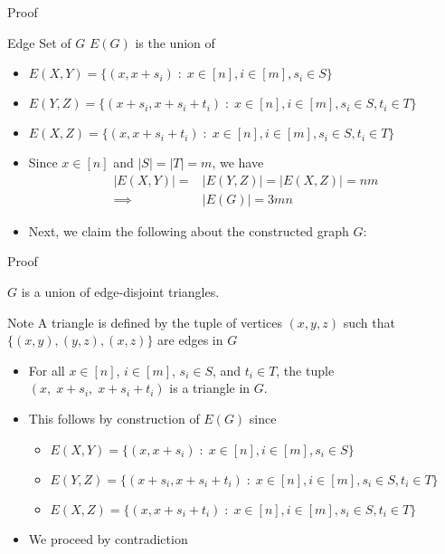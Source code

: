 \begin{frame}{Proof}

\begin{block}{Edge Set of $G$}
$E(G)$ is the union of
\begin{itemize}
	\item $E(X,Y) = \big\lbrace (x, x+s_i)\;\colon\; x\in [n], i \in [m], s_i \in S \big\rbrace$
	\item $E(Y,Z) = \big\lbrace (x+s_i, x+s_i+t_i)\;\colon\; x\in[n], i\in[m], s_i \in S, t_i \in T \big\rbrace$
	\item $E(X,Z) = \big\lbrace (x, x+s_i+t_i)\;\colon\; x\in[n], i\in[m], s_i \in S, t_i \in T \big\rbrace$
\end{itemize}
\end{block}
\begin{itemize}
	\item<2-> Since $x \in [n]$ and $|S|=|T|=m$, we have
	\begin{align*}
	|E(X,Y)| = &|E(Y,Z)| = |E(X,Z)| = nm\\
	\implies &|E(G)| = 3mn
	\end{align*}
	
	\item<3-> Next, we claim the following about the constructed graph $G$:
\end{itemize}

\end{frame}

\begin{frame}{Proof}

{
\begin{claim}
	$G$ is a union of edge-disjoint triangles.
\end{claim}}

\begin{block}{Note}
	A triangle is defined by the tuple of vertices $(x,y,z)$ such that $\big\lbrace (x,y), (y,z), (x,z) \big\rbrace$ are edges in $G$
\end{block}

\begin{itemize}
	\item<2-> For all $x\in [n]$, $i\in [m]$, $s_i \in S$, and $t_i \in T$, the tuple $(x,\; x+s_i,\; x+s_i+t_i)$ is a triangle in $G$.
	
	\item<3-> This follows by construction of $E(G)$ since
	\begin{itemize}
		\item $E(X,Y) = \big\lbrace (x, x+s_i)\;\colon\; x\in [n], i \in [m], s_i \in S \big\rbrace$
		\item $E(Y,Z) = \big\lbrace (x+s_i, x+s_i+t_i)\;\colon\; x\in[n], i\in[m], s_i \in S, t_i \in T \big\rbrace$
		\item $E(X,Z) = \big\lbrace (x, x+s_i+t_i)\;\colon\; x\in[n], i\in[m], s_i \in S, t_i \in T \big\rbrace$
	\end{itemize}
	\item<4-> We proceed by contradiction
\end{itemize}
\end{frame}

